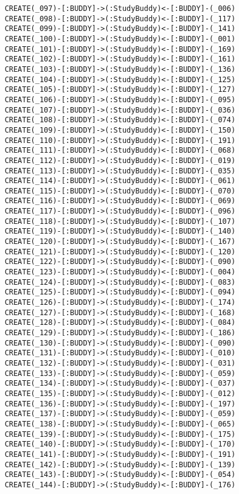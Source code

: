 \begin{lstlisting}
	CREATE(_097)-[:BUDDY]->(:StudyBuddy)<-[:BUDDY]-(_006)
	CREATE(_098)-[:BUDDY]->(:StudyBuddy)<-[:BUDDY]-(_117)
	CREATE(_099)-[:BUDDY]->(:StudyBuddy)<-[:BUDDY]-(_141)
	CREATE(_100)-[:BUDDY]->(:StudyBuddy)<-[:BUDDY]-(_001)
	CREATE(_101)-[:BUDDY]->(:StudyBuddy)<-[:BUDDY]-(_169)
	CREATE(_102)-[:BUDDY]->(:StudyBuddy)<-[:BUDDY]-(_161)
	CREATE(_103)-[:BUDDY]->(:StudyBuddy)<-[:BUDDY]-(_136)
	CREATE(_104)-[:BUDDY]->(:StudyBuddy)<-[:BUDDY]-(_125)
	CREATE(_105)-[:BUDDY]->(:StudyBuddy)<-[:BUDDY]-(_127)
	CREATE(_106)-[:BUDDY]->(:StudyBuddy)<-[:BUDDY]-(_095)
	CREATE(_107)-[:BUDDY]->(:StudyBuddy)<-[:BUDDY]-(_036)
	CREATE(_108)-[:BUDDY]->(:StudyBuddy)<-[:BUDDY]-(_074)
	CREATE(_109)-[:BUDDY]->(:StudyBuddy)<-[:BUDDY]-(_150)
	CREATE(_110)-[:BUDDY]->(:StudyBuddy)<-[:BUDDY]-(_191)
	CREATE(_111)-[:BUDDY]->(:StudyBuddy)<-[:BUDDY]-(_068)
	CREATE(_112)-[:BUDDY]->(:StudyBuddy)<-[:BUDDY]-(_019)
	CREATE(_113)-[:BUDDY]->(:StudyBuddy)<-[:BUDDY]-(_035)
	CREATE(_114)-[:BUDDY]->(:StudyBuddy)<-[:BUDDY]-(_061)
	CREATE(_115)-[:BUDDY]->(:StudyBuddy)<-[:BUDDY]-(_070)
	CREATE(_116)-[:BUDDY]->(:StudyBuddy)<-[:BUDDY]-(_069)
	CREATE(_117)-[:BUDDY]->(:StudyBuddy)<-[:BUDDY]-(_096)
	CREATE(_118)-[:BUDDY]->(:StudyBuddy)<-[:BUDDY]-(_107)
	CREATE(_119)-[:BUDDY]->(:StudyBuddy)<-[:BUDDY]-(_140)
	CREATE(_120)-[:BUDDY]->(:StudyBuddy)<-[:BUDDY]-(_167)
	CREATE(_121)-[:BUDDY]->(:StudyBuddy)<-[:BUDDY]-(_120)
	CREATE(_122)-[:BUDDY]->(:StudyBuddy)<-[:BUDDY]-(_090)
	CREATE(_123)-[:BUDDY]->(:StudyBuddy)<-[:BUDDY]-(_004)
	CREATE(_124)-[:BUDDY]->(:StudyBuddy)<-[:BUDDY]-(_083)
	CREATE(_125)-[:BUDDY]->(:StudyBuddy)<-[:BUDDY]-(_094)
	CREATE(_126)-[:BUDDY]->(:StudyBuddy)<-[:BUDDY]-(_174)
	CREATE(_127)-[:BUDDY]->(:StudyBuddy)<-[:BUDDY]-(_168)
	CREATE(_128)-[:BUDDY]->(:StudyBuddy)<-[:BUDDY]-(_084)
	CREATE(_129)-[:BUDDY]->(:StudyBuddy)<-[:BUDDY]-(_186)
	CREATE(_130)-[:BUDDY]->(:StudyBuddy)<-[:BUDDY]-(_090)
	CREATE(_131)-[:BUDDY]->(:StudyBuddy)<-[:BUDDY]-(_010)
	CREATE(_132)-[:BUDDY]->(:StudyBuddy)<-[:BUDDY]-(_031)
	CREATE(_133)-[:BUDDY]->(:StudyBuddy)<-[:BUDDY]-(_059)
	CREATE(_134)-[:BUDDY]->(:StudyBuddy)<-[:BUDDY]-(_037)
	CREATE(_135)-[:BUDDY]->(:StudyBuddy)<-[:BUDDY]-(_012)
	CREATE(_136)-[:BUDDY]->(:StudyBuddy)<-[:BUDDY]-(_197)
	CREATE(_137)-[:BUDDY]->(:StudyBuddy)<-[:BUDDY]-(_059)
	CREATE(_138)-[:BUDDY]->(:StudyBuddy)<-[:BUDDY]-(_065)
	CREATE(_139)-[:BUDDY]->(:StudyBuddy)<-[:BUDDY]-(_175)
	CREATE(_140)-[:BUDDY]->(:StudyBuddy)<-[:BUDDY]-(_170)
	CREATE(_141)-[:BUDDY]->(:StudyBuddy)<-[:BUDDY]-(_191)
	CREATE(_142)-[:BUDDY]->(:StudyBuddy)<-[:BUDDY]-(_139)
	CREATE(_143)-[:BUDDY]->(:StudyBuddy)<-[:BUDDY]-(_054)
	CREATE(_144)-[:BUDDY]->(:StudyBuddy)<-[:BUDDY]-(_176)

\end{lstlisting}
